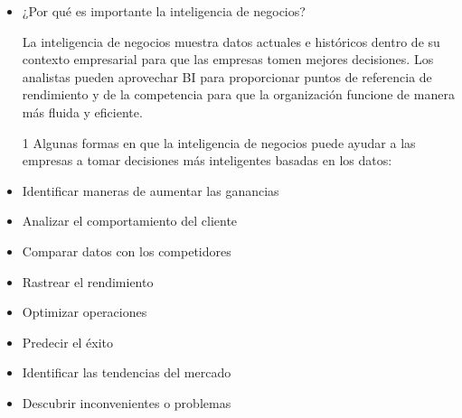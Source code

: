 \documentclass[twoside,twocolumn]{article}
\begin{document}
\begin{itemize}
\item ¿Por qué es importante la inteligencia de negocios?
\newline

La inteligencia de negocios muestra datos actuales e históricos dentro de su contexto empresarial para que las empresas tomen mejores decisiones. Los analistas pueden aprovechar BI para proporcionar puntos de referencia de rendimiento y de la competencia para que la organización funcione de manera más fluida y eficiente. 
\newline

	\item [1] Algunas formas en que la inteligencia de negocios puede ayudar a las empresas a tomar decisiones más inteligentes basadas en los datos:
	\newline
	
		\item Identificar maneras de aumentar las ganancias
		\item Analizar el comportamiento del cliente
		\item Comparar datos con los competidores
		\item Rastrear el rendimiento
		\item Optimizar operaciones
		\item Predecir el éxito
		\item Identificar las tendencias del mercado
		\item Descubrir inconvenientes o problemas
		
		

\end{itemize}
\end{document}
